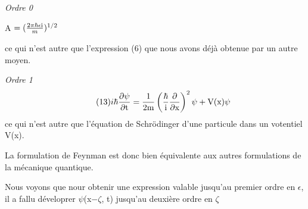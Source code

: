 {\it Ordre 0}
\begin{center}
A $= ( \frac{2\pi\hbar\epsilon\text{i}}{m} )^{1/2}$
\end{center}
ce qui n'est autre que l'expression (6) que nous avons déjà obtenue par
un autre moyen.

{\it Ordre 1}
\[
\tag{13} \text{}i\hbar\frac{\partial\psi}{\partial\text{t}} =
\frac{1}{2\text{m}}\left(\frac{\hbar}{\text{i}}\frac{\partial}{\partial\text{x}}\right)^2\psi
+\text{V(x)}\psi
\]
ce qui n'est autre que l'équation de Schrödinger d'une particule dans un
votentiel V(x).

La formulation de Feynman est donc bien équivalente aux autres
formulations de la mécanique quantique.

Nous voyons que nour obtenir une expression valable jusqu'au premier ordre
en $\epsilon$, il a fallu déveloprer $\psi$(x$-\zeta$, t) jusqu'au deuxière ordre en $\zeta$
%
